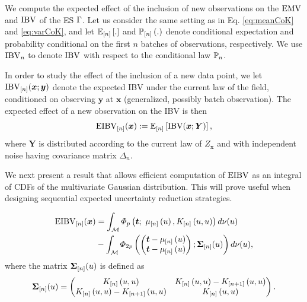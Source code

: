 \documentclass[aoas,preprint]{imsart}
\begin{document}
We compute the expected effect of the inclusion of new observations on
the $\operatorname{EMV}$ and $\operatorname{IBV}$ of the ES $\Gamma$. Let us consider the
same setting as in Eq. \eqref{eq:meanCoK} and \eqref{eq:varCoK}, and
let $\mathbb{E}_{[n]} \left[.\right]$ and $\mathbb{P}_{[n]} \left(.\right)$ denote conditional
expectation and probability conditional on the first $n$ batches of
observations, respectively. We use $\operatorname{IBV}_{n}$ to denote $\operatorname{IBV}$ with respect to the conditional law $\mathbb{P}_{n}$.

\medskip

In order to study the effect of the inclusion of a new data point, we
let $ \operatorname{IBV}_{[n]}(\bm{x}; \bm{y}) $ denote the expected IBV under the
current law of the field, conditioned on observing $\bm{y}$ at $\bm{x}$
(generalized, possibly batch observation). The expected effect of a
new observation on the IBV is then 
\begin{equation}\label{def:eibv}
    \currentEIBV(\bm{x}):=\currentExp{\mbox{IBV}(\bm{x}; \bm{Y})},
\end{equation}
where $\bm{Y}$ is distributed according to the current law of
$Z_{\bm{x}}$ and with independent noise having covariance matrix
$\Delta_n$.

We next present a result that allows efficient computation of $\operatorname{EIBV}$
as an integral of CDFs of the multivariate Gaussian distribution. This will prove
useful when designing sequential expected uncertainty reduction strategies.

\begin{propo}
\label{propo_eibv}
\begin{equation}
\begin{split}
\currentEIBV(\bm{x})
&=\int_{\domain} \varPhi_{\no}\left(\bt;~\currentMean{\uu}, \currentCov{u, u}\right) d\mes(u)\\
&-\int_{\domain} \varPhi_{2\no}
\left(
\left(
\begin{matrix}
\bt-\currentMean{u}\\
\bt-\currentMean{u}
\end{matrix}
\right);
\mathbf{\Sigma}_{[n]}(\uu)
\right)
d\mes(u),
\end{split}
\end{equation}
where the matrix $\mathbf{\Sigma}_{[n]}(u)$ is defined as
\begin{equation*}
\begin{split}
\mathbf{\Sigma}_{[n]}(\uu)&=
\left(
\begin{matrix}
\currentCov{u, u} & \currentCov{u, u}-\futureCov{u, u}\\
\currentCov{u, u}-\futureCov{u, u} & \currentCov{u, u}
\end{matrix}
\right).\\
\end{split}
\end{equation*}
\end{propo}
\end{document}
